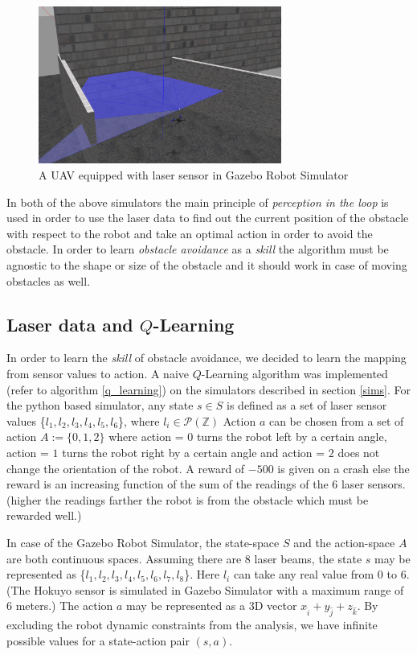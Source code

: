 \documentclass[12pt]{report}
\begin{document}
\begin{itemize}
\begin{figure}[htp]
	\centering
	\includegraphics[width=8cm]{perception_sim_2.png}
	\caption {A UAV equipped with laser sensor in Gazebo Robot Simulator}
   \label{fig:perception_sim_2}
\end{figure}
\end{itemize}

In both of the above simulators the main principle of \textit{perception in the loop} is used in order to use the laser data to find out the current position of the obstacle with respect to the robot and take an optimal action in order to avoid the obstacle. In order to learn \textit{obstacle avoidance} as a \textit{skill} the algorithm must be agnostic to the shape or size of the obstacle and it should work in case of moving obstacles as well.

\subsection{Laser data and $Q$-Learning}
\label{laser_learning}
In order to learn the \textit{skill} of obstacle avoidance, we decided to learn the mapping from sensor values to action. A naive $Q$-Learning algorithm was implemented (refer to algorithm \ref{q_learning}) on the simulators described in section \ref{sims}. For the python based simulator, any state $s \in S$ is defined as a set of laser sensor values \{$l_1,l_2,l_3,l_4,l_5,l_6$\}, where $l_i \in \mathcal {P} (\mathbb{Z})$ Action $a$ can be chosen from a set of action $A := \{0,1,2\}$ where action = $0$ turns the robot left by a certain angle, action = $1$ turns the robot right by a certain angle and action = $2$ does not change the orientation of the robot. A reward of $-500$ is given on a crash else the reward is an increasing function of the sum of the readings of the $6$ laser sensors. (higher the readings farther the robot is from the obstacle which must be rewarded well.)\par 
In case of the Gazebo Robot Simulator, the state-space $S$ and the action-space $A$ are both continuous spaces. Assuming there are $8$ laser beams, the state $s$ may be represented as \{$l_1,l_2,l_3,l_4,l_5,l_6,l_7,l_8$\}. Here $l_i$ can take any real value from $0$ to $6$. (The Hokuyo sensor is simulated in Gazebo Simulator with a maximum range of $6$ meters.) The action $a$ may be represented as a $3$D vector $x_{\hat{i}} + y_{\hat{j}} + z_{\hat{k}}$. By excluding the robot dynamic constraints from the analysis, we have infinite possible values for a state-action pair $(s,a)$.\par 
\end{document}
